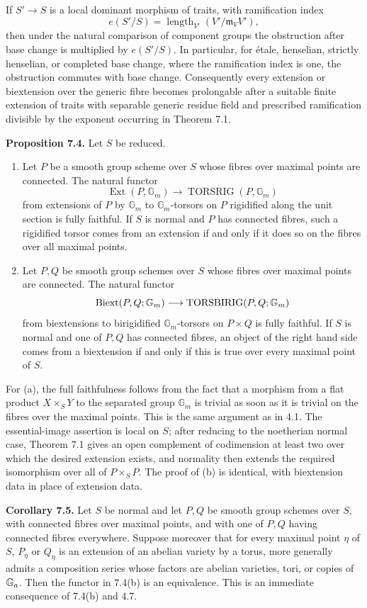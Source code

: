\documentclass[11pt]{article}
\providecommand{\Gm}{\mathbb G_m}
\providecommand{\Ext}{\operatorname{Ext}}
\begin{document}
If \(S'\to S\) is a local dominant morphism of traits, with ramification index
\[
  e(S'/S)=\operatorname{length}_{V'}(V'/\mathfrak m_VV'),
\]
then under the natural comparison of component groups the obstruction after base change is multiplied by \(e(S'/S)\).  In particular, for étale, henselian, strictly henselian, or completed base change, where the ramification index is one, the obstruction commutes with base change.  Consequently every extension or biextension over the generic fibre becomes prolongable after a suitable finite extension of traits with separable generic residue field and prescribed ramification divisible by the exponent occurring in Theorem 7.1.

\textbf{Proposition 7.4.}  Let \(S\) be reduced.
\begin{enumerate}[label=\alph*)]
\item Let \(P\) be a smooth group scheme over \(S\) whose fibres over maximal points are connected.  The natural functor
\[
  \Ext(P,\Gm)\longrightarrow \operatorname{TORSRIG}(P,\Gm)
\]
from extensions of \(P\) by \(\Gm\) to \(\Gm\)-torsors on \(P\) rigidified along the unit section is fully faithful.  If \(S\) is normal and \(P\) has connected fibres, such a rigidified torsor comes from an extension if and only if it does so on the fibres over all maximal points.
\item Let \(P,Q\) be smooth group schemes over \(S\) whose fibres over maximal points are connected.  The natural functor
\[
  \Biext(P,Q;\Gm)\longrightarrow \operatorname{TORSBIRIG}(P,Q;\Gm)
\]
from biextensions to birigidified \(\Gm\)-torsors on \(P\times Q\) is fully faithful.  If \(S\) is normal and one of \(P,Q\) has connected fibres, an object of the right hand side comes from a biextension if and only if this is true over every maximal point of \(S\).
\end{enumerate}

For (a), the full faithfulness follows from the fact that a morphism from a flat product \(X\times_SY\) to the separated group \(\Gm\) is trivial as soon as it is trivial on the fibres over the maximal points.  This is the same argument as in 4.1.  The essential-image assertion is local on \(S\); after reducing to the noetherian normal case, Theorem 7.1 gives an open complement of codimension at least two over which the desired extension exists, and normality then extends the required isomorphism over all of \(P\times_SP\).  The proof of (b) is identical, with biextension data in place of extension data.

\textbf{Corollary 7.5.}  Let \(S\) be normal and let \(P,Q\) be smooth group schemes over \(S\), with connected fibres over maximal points, and with one of \(P,Q\) having connected fibres everywhere.  Suppose moreover that for every maximal point \(\eta\) of \(S\), \(P_\eta\) or \(Q_\eta\) is an extension of an abelian variety by a torus, more generally admits a composition series whose factors are abelian varieties, tori, or copies of \(\mathbb G_a\).  Then the functor in 7.4(b) is an equivalence.  This is an immediate consequence of 7.4(b) and 4.7.
\end{document}
